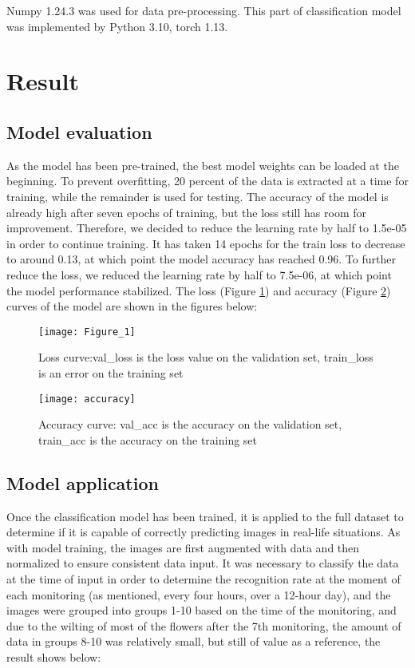 \documentclass[11pt,a4paper]{article}
\begin{document}
\begin{spacing}{1.5}
Numpy 1.24.3 was used for data pre-processing. This part of classification model was implemented by Python 3.10, torch 1.13.

\section{Result}

\subsection{Model evaluation}
As the model has been pre-trained, the best model weights can be loaded at the beginning. To prevent overfitting, 20 percent of the data is extracted at a time for training, while the remainder is used for testing. The accuracy of the model is already high after seven epochs of training, but the loss still has room for improvement. Therefore, we decided to reduce the learning rate by half to 1.5e-05 in order to continue training. It has taken 14 epochs for the train loss to decrease to around 0.13, at which point the model accuracy has reached 0.96. To further reduce the loss, we reduced the learning rate by half to 7.5e-06, at which point the model performance stabilized. The loss (Figure \ref{Loss}) and accuracy (Figure \ref{Accuracy}) curves of the model are shown in the figures below:

\begin{figure}[htbp]
\centering
\texttt{[image: Figure\_1]}
\caption{Loss curve:val\_loss is the loss value on the validation set, train\_loss is an error on the training set}
\label{Loss}
\end{figure}

\begin{figure}[htbp]
\centering
\texttt{[image: accuracy]}
\caption{Accuracy curve: val\_acc is the accuracy on the validation set, train\_acc is the accuracy on the training set}
\label{Accuracy}
\end{figure}


\subsection{Model application}
Once the classification model has been trained, it is applied to the full dataset to determine if it is capable of correctly predicting images in real-life situations. As with model training, the images are first augmented with data and then normalized to ensure consistent data input. It was necessary to classify the data at the time of input in order to determine the recognition rate at the moment of each monitoring (as mentioned, every four hours, over a 12-hour day), and the images were grouped into groups 1-10 based on the time of the monitoring, and due to the wilting of most of the flowers after the 7th monitoring, the amount of data in groups 8-10 was relatively small, but still of value as a reference, the result shows below:


\end{spacing}
\end{document}
